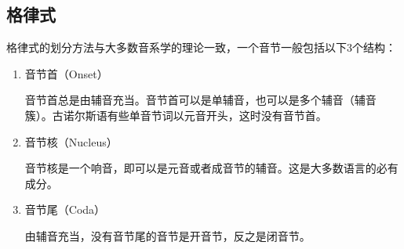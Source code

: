 \subsection*{格律式}

格律式的划分方法与大多数音系学的理论一致，一个音节一般包括以下3个结构：
\begin{enumerate}
    \item 音节首（Onset）

          音节首总是由辅音充当。音节首可以是单辅音，也可以是多个辅音（辅音簇）。古诺尔斯语有些单音节词以元音开头，这时没有音节首。
    \item 音节核（Nucleus）

          音节核是一个响音，即可以是元音或者成音节的辅音。这是大多数语言的必有成分。
    \item 音节尾（Coda）

          由辅音充当，没有音节尾的音节是开音节，反之是闭音节。

\end{enumerate}

